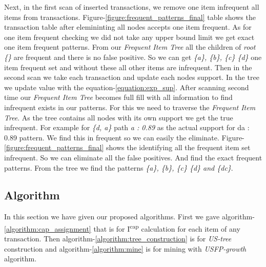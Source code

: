     Next, in the first scan of inserted transactions, we remove one item infrequent all items from transactions. Figure-\ref{figure:frequent_patterns_final} table shows the transaction table after elemininting all nodes accepts one item frequent. As for one item frequent checking we did not take any upper bound limit we get exact one item frequent patterns. From our \emph{Frequent Item Tree} all the children of \emph{root \{\}} are frequent and there is no false positive. So we can get \emph{\{a\}, \{b\}, \{c\} \{d\}} one item frequent set and without these all other items are infrequent.  Then in the second scan we take each transaction and update each nodes support. In the tree we update value with the equation-\ref{equation:exp_sup}. After scanning second time our \emph{Frequent Item Tree} becomes full fill with all information to find infrequent exists in our patterns. For this we need to traverse the \emph{Frequent Item Tree}. As the tree contains all nodes with its own support we get the true infrequent. For example for \emph{\{d, a\}} path \emph{a : 0.89} as the actual support for {da : 0.89} pattern. We find this in frequent so we can easily the eliminate. Figure-\ref{figure:frequent_patterns_final} shows the identifying all the frequent item set infrequent. So we can eliminate all the false positives.    And find the exact frequent patterns. From the tree we find the patterns \emph{\{a\}, \{b\}, \{c\} \{d\} and \{dc\}}.
    
\clearpage    
    \subsection{Algorithm}
    In this section we have given our proposed algorithms. First we gave algorithm-\ref{algorithm:cap_assignment} that is for I\textsuperscript{cap} calculation for each item of any transaction. Then algorithm-\ref{algorithm:tree_construction} is for \emph{US-tree} construction and algorithm-\ref{algorithm:mine} is for mining with \emph{USFP-growth} algorithm.
    
\clearpage
